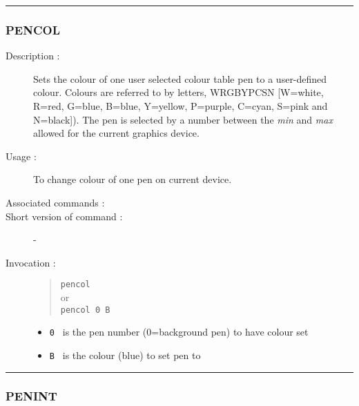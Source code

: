 \hrule
\subsubsection*{\label{PENCOL}PENCOL}

\begin{description}

\item[Description :] Sets the colour of one user selected colour table
pen to a user-defined colour.  Colours are referred to by letters,
WRGBYPCSN [W=white, R=red, G=blue, B=blue, Y=yellow, P=purple, C=cyan,
S=pink and N=black]).  The pen is selected by a number between the {\it
min} and {\it max} allowed for the current graphics device.

\item[Usage :] To change colour of one pen on current device.
\item[Associated commands :] {\tt {}}
\item[Short version of command :] -
\item[Invocation :]

\begin{quote}{\tt  pencol }\\
or \\
{\tt pencol 0 B }
\end{quote}

\begin{itemize}

\item {\tt 0 } is the pen number (0=background pen) to have colour set
\item {\tt B } is the colour (blue) to set pen to
\end{itemize}

\end{description}

\hrule
\subsubsection*{\label{PENINT}PENINT}

